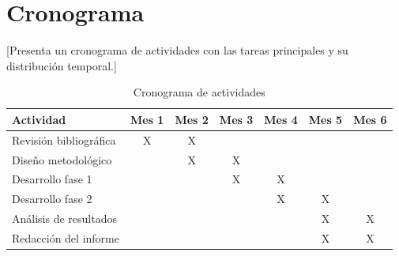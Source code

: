 \section{Cronograma}
\label{sec:cronograma}

[Presenta un cronograma de actividades con las tareas principales y su distribución temporal.]

\begin{table}[H]
\centering
\begin{tabular}{|l|c|c|c|c|c|c|}
\hline
\textbf{Actividad} & \textbf{Mes 1} & \textbf{Mes 2} & \textbf{Mes 3} & \textbf{Mes 4} & \textbf{Mes 5} & \textbf{Mes 6} \\ \hline
Revisión bibliográfica & X & X & & & & \\ \hline
Diseño metodológico & & X & X & & & \\ \hline
Desarrollo fase 1 & & & X & X & & \\ \hline
Desarrollo fase 2 & & & & X & X & \\ \hline
Análisis de resultados & & & & & X & X \\ \hline
Redacción del informe & & & & & X & X \\ \hline
\end{tabular}
\caption{Cronograma de actividades}
\label{tab:cronograma}
\end{table}
